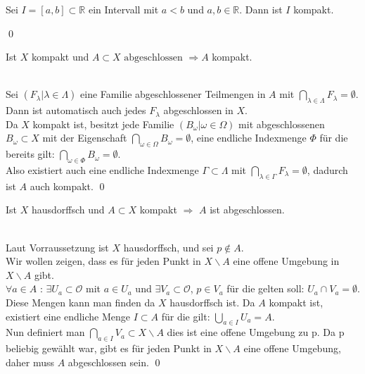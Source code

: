 \begin{Satz}
	Sei \(I = [ a , b ] \subset \mathbb{R}\) ein Intervall mit \(a<b\) und \(a,b \in \mathbb{R}\). Dann 
	ist \(I\) kompakt.
\end{Satz}
\qed

\begin{Satz}
		Ist \(X\) kompakt und \(A \subset X \mbox{ abgeschlossen } \Rightarrow A\) kompakt.
\end{Satz}
%
	\\
 	Sei \((F_{\lambda} | \lambda \in \Lambda) \) eine Familie abgeschlossener Teilmengen in \(A\) mit \( \bigcap_{\lambda \in \Lambda } F_{\lambda} = \emptyset \).\\
	Dann ist automatisch auch jedes \(F_{\lambda} \) abgeschlossen in \(X\).\\
	Da \(X\) kompakt ist, besitzt jede Familie \((B_{\omega} | \omega \in \Omega) \) mit abgeschlossenen 
	\(B_{\omega} \subset X \) mit der Eigenschaft \( \bigcap_{\omega \in \Omega} B_{\omega} = \emptyset\), eine 
	endliche Indexmenge \(\Phi \) für die bereits gilt: \( \bigcap_{\omega \in \Phi} B_{\omega} = \emptyset\).\\
	Also existiert auch eine endliche Indexmenge \( \Gamma \subset \Lambda \) mit \( \bigcap_{\lambda \in \Gamma } F_{\lambda} = \emptyset \), dadurch ist 
	\(A\) auch kompakt.
\qed
		
		
\begin{Satz}
	Ist \(X\) hausdorffsch und \(A \subset X \) kompakt \( \Rightarrow \) \(A\) ist abgeschlossen.
\end{Satz}
%
	\\
	Laut Vorraussetzung ist \(X\) hausdorffsch, und sei \(p \notin A \). \\
	Wir wollen zeigen, dass es für jeden Punkt in \(X \backslash A \) eine offene Umgebung in \(X \backslash A \) gibt.\\
	\( \forall a \in A\) : \(\exists U_{a}\subset \mathcal{O} \) mit \(  a \in U_{a}\) und \(\exists V_{a}\subset \mathcal{O} \), \(  p \in V_{a}\) für die gelten soll:
	 \(U_{a} \cap V_{a} = \emptyset \). Diese Mengen kann man finden da \(X\) hausdorffsch ist. Da \(A\) kompakt ist, existiert eine endliche Menge \(I \subset A\) für die gilt:
	\( \bigcup_{a \in I} U_{a} = A \). \\
	Nun definiert man \(\bigcap_{a \in I} V_{a} \subset X\backslash A \) dies ist eine offene Umgebung zu p. Da p beliebig gewählt war, gibt es 
	für jeden Punkt in \(X\backslash A \) eine offene Umgebung, daher muss \(A\) abgeschlossen sein. 
\qed
		
